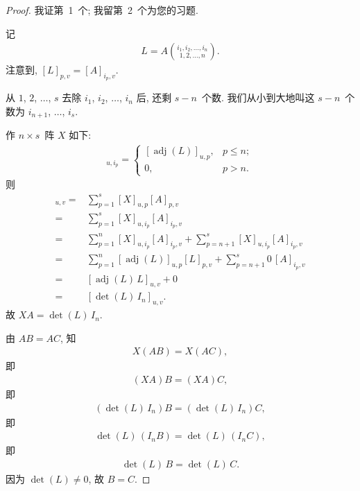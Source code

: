 \begin{proof}
    我证第~1~个; 我留第~2~个为您的习题.

    记
    \begin{align*}
        L = A\binom{i_1,i_2,\dots,i_n}{1,2,\dots,n}.
    \end{align*}
    注意到, \([L]_{p,v} = [A]_{i_p,v}\).

    从 \(1\), \(2\), \(\dots\), \(s\)
    去除 \(i_1\), \(i_2\), \(\dots\), \(i_n\)
    后, 还剩 \(s - n\)~个数.
    我们从小到大地叫这 \(s - n\)~个数为
    \(i_{n+1}\), \(\dots\), \(i_s\).

    作 \(n \times s\)~阵 \(X\) 如下:
    \begin{align*}
        [X]_{u,i_p}
        = \begin{cases}
              [\operatorname{adj} {(L)}]_{u,p},
                 & p \leq n; \\
              0, & p > n.
          \end{cases}
    \end{align*}
    则
    \begin{align*}
        [XA]_{u,v}
        = {} &
        \sum_{p = 1}^{s} {[X]_{u,p} [A]_{p,v}}
        \\
        = {} &
        \sum_{p = 1}^{s} {[X]_{u,i_p} [A]_{i_p,v}}
        \\
        = {} &
        \sum_{p = 1}^{n} {[X]_{u,i_p} [A]_{i_p,v}}
        + \sum_{p = n+1}^{s} {[X]_{u,i_p} [A]_{i_p,v}}
        \\
        = {} &
        \sum_{p = 1}^{n}
        {[\operatorname{adj} {(L)}]_{u,p} [L]_{p,v}}
        + \sum_{p = n+1}^{s} {0\, [A]_{i_p,v}}
        \\
        = {} &
        [\operatorname{adj} {(L)}\, L]_{u,v} + 0
        \\
        = {} &
        [\det {(L)}\,I_n]_{u,v}.
    \end{align*}
    故 \(X A = \det {(L)}\, I_n\).

    由 \(AB = AC\), 知
    \begin{align*}
        X (AB) = X (AC),
    \end{align*}
    即
    \begin{align*}
        (X A) B = (X A) C,
    \end{align*}
    即
    \begin{align*}
        (\det {(L)}\,I_n) B = (\det {(L)}\,I_n) C,
    \end{align*}
    即
    \begin{align*}
        \det {(L)}\,(I_n B) = \det {(L)}\,(I_n C),
    \end{align*}
    即
    \begin{align*}
        \det {(L)}\,B = \det {(L)}\,C.
    \end{align*}
    因为 \(\det {(L)} \neq 0\),
    故 \(B = C\).
\end{proof}

